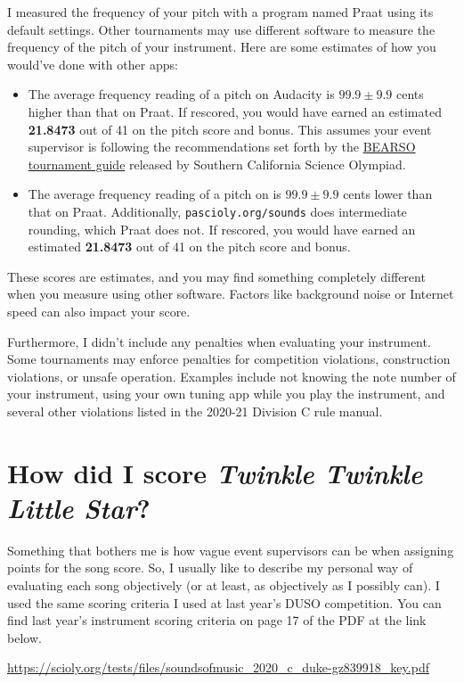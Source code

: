 \documentclass[12pt,letterpaper]{article}
\def\audacityEstimate{21.8473}
\def\pasciolyEstimate{21.8473}
\begin{document}
I measured the frequency of your pitch with a program named Praat using its default settings. Other tournaments may use different software to measure the frequency of the pitch of your instrument. Here are some estimates of how you would've done with other apps:
\begin{itemize}
\item The average frequency reading of a pitch on Audacity is $99.9\pm9.9$ cents higher than that on Praat. If rescored, you would have earned an estimated \textbf{\audacityEstimate} out of 41 on the pitch score and bonus. This assumes your event supervisor is following the recommendations set forth by the \href{https://docs.google.com/document/d/1VBmM2NzHvc5F2ZHKz4Warf_NGrkn1ADL1Gx0DPHVrJ4/edit#bookmark=id.lu1jk8vh7g7z}{BEARSO tournament guide} released by Southern California Science Olympiad.

\item The average frequency reading of a pitch on  is $99.9\pm9.9$ cents lower than that on Praat. Additionally, {\texttt{pascioly.org/sounds}} does intermediate rounding, which Praat does not. If rescored, you would have earned an estimated \textbf{\pasciolyEstimate} out of 41 on the pitch score and bonus.
\end{itemize}
These scores are estimates, and you may find something completely different when you measure using other software. Factors like background noise or Internet speed can also impact your score.

Furthermore, I didn't include any penalties when evaluating your instrument. Some tournaments may enforce penalties for competition violations, construction violations, or unsafe operation. Examples include not knowing the note number of your instrument, using your own tuning app while you play the instrument, and several other violations listed in the 2020-21 Division C rule manual.

\section{How did I score \emph{Twinkle Twinkle Little Star}?}

Something that bothers me is how vague event supervisors can be when assigning points for the song score. So, I usually like to describe my personal way of evaluating each song objectively (or at least, as objectively as I possibly can). I used the same scoring criteria I used at last year's DUSO competition. You can find last year's instrument scoring criteria on page 17 of the PDF at the link below. 

\url{https://scioly.org/tests/files/soundsofmusic_2020_c_duke-gz839918_key.pdf}

\vfill
\hfill{}
\end{document}

